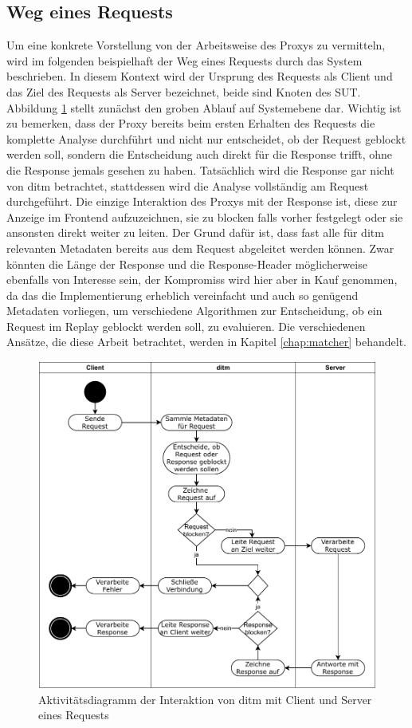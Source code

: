\documentclass[12pt,a4paper]{report}
\begin{document}
\subsection{Weg eines Requests}
Um eine konkrete Vorstellung von der Arbeitsweise des Proxys zu vermitteln, wird im folgenden beispielhaft der Weg eines
Requests durch das System beschrieben. In diesem Kontext wird der Ursprung des Requests als Client und das Ziel des
Requests als Server bezeichnet, beide sind Knoten des SUT. Abbildung \ref{fig:activity} stellt zunächst den groben Ablauf auf Systemebene dar.
Wichtig ist zu bemerken, dass der Proxy bereits beim ersten Erhalten des Requests die komplette Analyse durchführt und
nicht nur entscheidet, ob der Request geblockt werden soll, sondern die Entscheidung auch direkt für die Response trifft,
ohne die Response jemals gesehen zu haben. Tatsächlich wird die Response gar nicht von ditm betrachtet, stattdessen wird
die Analyse vollständig am Request durchgeführt. Die einzige Interaktion des Proxys mit der Response ist, diese zur Anzeige im
Frontend aufzuzeichnen, sie zu blocken falls vorher festgelegt oder sie ansonsten direkt weiter zu leiten.
Der Grund dafür ist, dass fast alle für ditm relevanten Metadaten bereits aus dem Request abgeleitet werden können. Zwar
könnten die Länge der Response und die Response-Header möglicherweise ebenfalls von Interesse sein, der Kompromiss wird
hier aber in Kauf genommen, da das die Implementierung erheblich vereinfacht und auch so genügend Metadaten vorliegen,
um verschiedene Algorithmen zur Entscheidung, ob ein Request im Replay geblockt werden soll, zu evaluieren.
Die verschiedenen Ansätze, die diese Arbeit betrachtet, werden in Kapitel \ref{chap:matcher} behandelt.
\begin{figure}[H]
	\centering
	\includegraphics[width=\linewidth]{img/ditm-Activity.pdf}
	\caption{Aktivitätsdiagramm der Interaktion von ditm mit Client und Server eines Requests}
	\label{fig:activity}
\end{figure}
\end{document}
